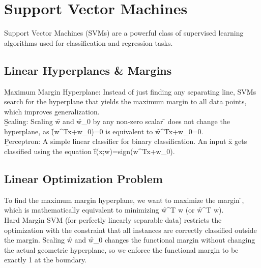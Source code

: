 \section{Support Vector Machines}
Support Vector Machines (SVMs) are a powerful class of supervised learning algorithms used for classification and regression tasks.


\subsection{Linear Hyperplanes \& Margins}
\vspace{.5em}
\b{Maximum Margin Hyperplane}: Instead of just finding any separating line, SVMs search for the hyperplane that yields the maximum margin to all data points, which improves generalization.\\[1em]
\b{Scaling}: Scaling \f{w} and \f{w_0} by any non-zero scalar \f{\beta} does not change the hyperplane, as \f{\beta(w^Tx+w_0)=0} is equivalent to \f{w^Tx+w_0=0}.\\[1em]
\b{Perceptron}: A simple linear classifier for binary classification. An input \f{x} gets classified using the equation \f{f(x;w)=sign(w^Tx+w_0)}.




\subsection{Linear Optimization Problem}
To find the maximum margin hyperplane, we want to maximize the margin \f{}, which is mathematically equivalent to minimizing \f{w^T w} (or \f{w^T w}).\\[1em]
\b{Hard Margin SVM} (for perfectly linearly separable data) restricts the optimization with the constraint that all instances are correctly classified outside the margin.
Scaling \f{w} and \f{w_0} changes the functional margin without changing the actual geometric hyperplane, so we enforce the functional margin to be exactly 1 at the boundary.





